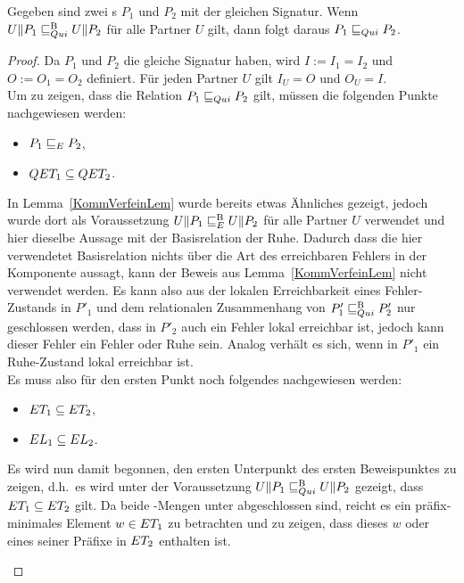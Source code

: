 \begin{Lem}
  \label{RuheVerfeinLem}
  Gegeben sind zwei \MEIO{}s $P_1$ und $P_2$ mit der gleichen Signatur. Wenn
  $U\|P_1 \sqsubseteq  _{Qui}^\mathrm{B} U\|P_2$ für alle Partner $U$ gilt, dann folgt daraus $P_1 \sqsubseteq  _{Qui}
  P_2$.
\end{Lem}
\begin{proof}
  Da $P_1$ und $P_2$ die gleiche Signatur haben, wird $I:=I_1=I_2$ und
  $O:=O_1=O_2$ definiert. Für jeden Partner $U$ gilt $I_U=O$ und $O_U=I$.\\
  Um zu zeigen, dass die Relation $P_1 \sqsubseteq  _{Qui} P_2$ gilt, müssen die folgenden
  Punkte nachgewiesen werden:
  \begin{itemize}
    \item $P_1 \sqsubseteq  _E P_2$,
    \item $QET _1\subseteq QET _2$.
  \end{itemize}
  In Lemma~\ref{KommVerfeinLem} wurde bereits etwas Ähnliches gezeigt, jedoch
  wurde dort als Voraussetzung $U\|P_1 \sqsubseteq  _E^\mathrm{B} U\|P_2$ für alle Partner $U$
  verwendet und hier dieselbe Aussage mit der Basisrelation der Ruhe. Dadurch
  dass die hier verwendetet Basisrelation nichts über die Art des erreichbaren
  Fehlers in der Komponente aussagt, kann der Beweis aus
  Lemma~\ref{KommVerfeinLem} nicht verwendet werden. Es kann also aus der
  lokalen Erreichbarkeit eines Fehler-Zustands in
  $P'_1$ und dem relationalen Zusammenhang von $P'_1 \sqsubseteq  _{Qui}^\mathrm{B} P'_2$ nur
  geschlossen werden, dass in $P'_2$ auch ein \glqq Fehler\grqq{} lokal
  erreichbar ist, jedoch kann dieser \glqq Fehler\grqq{} ein Fehler oder Ruhe
  sein. Analog verhält es sich, wenn in $P'_1$ ein Ruhe-Zustand lokal erreichbar ist.
  \\
  Es muss also für den ersten Punkt noch folgendes nachgewiesen werden:
  \begin{itemize}
    \item $ET _1\subseteq ET _2$,
    \item $EL _1\subseteq EL _2$.
  \end{itemize}
  Es wird nun damit begonnen, den ersten Unterpunkt des ersten Beweispunktes zu
  zeigen, d.h.\ es wird unter der Voraussetzung $U\|P_1 \sqsubseteq  _{Qui}^\mathrm{B} U\|P_2$ gezeigt,
  dass $ET _1\subseteq ET _2$ gilt. Da beide \ET{}-Mengen unter \cont{}
  abgeschlossen sind, reicht es ein präfix-minimales Element $w\in ET _1$ zu
  betrachten und zu zeigen, dass dieses $w$ oder eines seiner Präfixe in $ET
  _2$ enthalten ist.
  \begin{itemize}

\end{itemize}
\end{proof}
